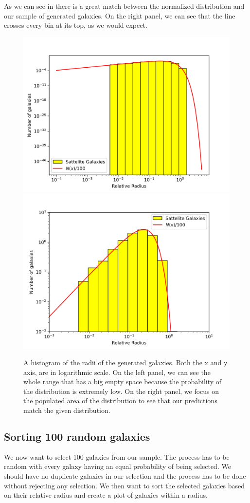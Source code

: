 \documentclass[a4paper,10pt]{article}
\begin{document}
As we can see in  there is a great match between the normalized distribution and our sample of generated galaxies. On the right panel, we can see that the line crosses every bin at its top, as we would expect.  


\begin{figure}[H]
  \centering
  \includegraphics[width=0.49\linewidth]{./plots/distr.png}
  \includegraphics[width=0.49\linewidth]{./plots/distr_zoom.png}
  \caption{A histogram of the radii of the generated galaxies. Both the x and y axis, are in logarithmic scale. On the left panel, we can see the whole range that has a big empty space because the probability of the distribution is extremely low. On the right panel, we focus on the populated area of the distribution to see that our predictions match the given distribution.}
  \label{fig:distr}
\end{figure}

\subsection{Sorting 100 random galaxies}

We now want to select 100 galaxies from our sample. The process has to be random with every galaxy having an equal probability of being selected. We should have no duplicate galaxies in our selection and the process has to be done without rejecting any selection. We then want to sort the selected galaxies based on their relative radius and create a plot of galaxies within a radius.
\end{document}
